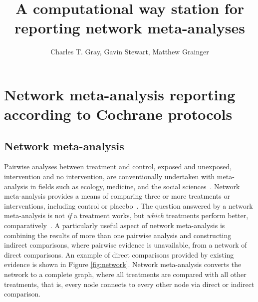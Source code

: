 \documentclass[12pt]{article}\usepackage[]{graphicx}\usepackage[]{color}
\title{A computational way station for reporting network meta-analyses}
\author{Charles T. Gray, Gavin Stewart, Matthew Grainger}
\begin{document}
\maketitle


\section{Network meta-analysis reporting according to Cochrane protocols}\label{sec:nma}


\subsection{Network meta-analysis}

Pairwise analyses between treatment and control, exposed and unexposed, intervention and no intervention, are conventionally undertaken with meta-analysis in fields such as ecology, medicine, and the social sciences~\cite{borenstein_introduction_2011}. Network meta-analysis provides a means of comparing three or more treatments or interventions, including control or placebo~\cite{higgins2019cochrane}. The question answered by a network meta-analysis is not \emph{if} a treatment works, but \emph{which} treatments perform better, comparatively~\cite{harrer_doing_2019}. A particularly useful aspect of network meta-analysis is combining the results of more than one pairwise analysis and constructing indirect comparisons, where pairwise evidence is unavailable, from a network of direct comparisons. An example of direct comparisons provided by existing evidence is shown in Figure \ref{fig:network}. Network meta-analysis converts the network to a complete graph, where all treatments are compared with all other treatments, that is, every node connects to every other node via direct or indirect comparison.
\end{document}
